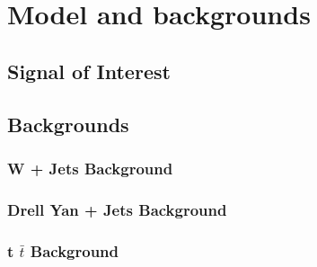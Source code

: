  \chapter{Model and backgrounds}

 
 \section{Signal of Interest}
 
 
 
 \section{Backgrounds}
 
 \subsection{W + Jets Background}
  
 \subsection{Drell Yan + Jets Background}
 
 \subsection{t $\bar{t}$ Background}
 
 